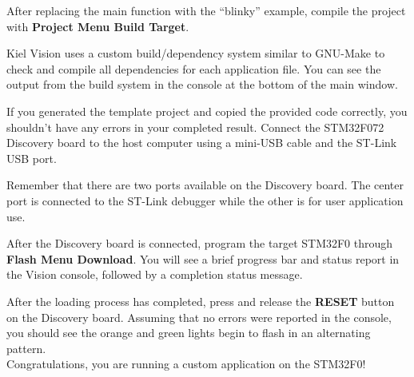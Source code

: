 \documentclass[11pt,fleqn]{book} %
\begin{document}
After replacing the main function with the ``blinky'' example, compile the project with \textbf{Project Menu \textrightarrow Build Target}. 

Kiel {\textmu}Vision uses a custom build/dependency system similar to GNU-Make to check and compile all dependencies for each application file. You can see the output from the build system in the console at the bottom of the main window.

If you generated the template project and copied the provided code correctly, you shouldn't have any errors in your completed result. Connect the STM32F072 Discovery board to the host computer using a mini-USB cable and the ST-Link USB port. 

\begin{warning}
	Remember that there are two ports available on the Discovery board. The center port is connected to the ST-Link debugger while the other is for user application use.
\end{warning}

After the Discovery board is connected, program the target STM32F0 through \textbf{Flash Menu \textrightarrow Download}. You will see a brief progress bar and status report in the {\textmu}Vision console, followed by a completion status message. 

After the loading process has completed, press and release the \textbf{RESET} button on the Discovery board. Assuming that no errors were reported in the console, you should see the orange and green lights begin to flash in an alternating pattern. \\

Congratulations, you are running a custom application on the STM32F0! 







\end{document}
